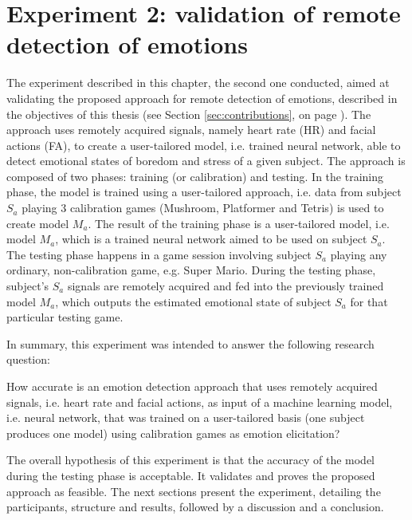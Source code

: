 \chapter{Experiment 2: validation of remote detection of emotions}
\label{ch:experiment2}

The experiment described in this chapter, the second one conducted, aimed at validating the proposed approach for remote detection of emotions, described in the objectives of this thesis (see Section \ref{sec:contributions}, on page \pageref{sec:contributions}). The approach uses remotely acquired signals, namely heart rate (HR) and facial actions (FA), to create a user-tailored model, i.e. trained neural network, able to detect emotional states of boredom and stress of a given subject. The approach is composed of two phases: training (or calibration) and testing. In the training phase, the model is trained using a user-tailored approach, i.e. data from subject $S_a$ playing 3 calibration games (Mushroom, Platformer and Tetris) is used to create model $M_a$. The result of the training phase is a user-tailored model, i.e. model $M_a$, which is a trained neural network aimed to be used on subject $S_a$. The testing phase happens in a game session involving subject $S_a$ playing any ordinary, non-calibration game, e.g. Super Mario. During the testing phase, subject's $S_a$ signals are remotely acquired and fed into the previously trained model $M_a$, which outputs the estimated emotional state of subject $S_a$ for that particular testing game.

In summary, this experiment was intended to answer the following research question:

\begin{fquote}
How accurate is an emotion detection approach that uses remotely acquired signals, i.e. heart rate and facial actions, as input of a machine learning model, i.e. neural network, that was trained on a user-tailored basis (one subject produces one model) using calibration games as emotion elicitation?
\end{fquote}

The overall hypothesis of this experiment is that the accuracy of the model during the testing phase is acceptable. It validates and proves the proposed approach as feasible. The next sections present the experiment, detailing the participants, structure and results, followed by a discussion and a conclusion.

